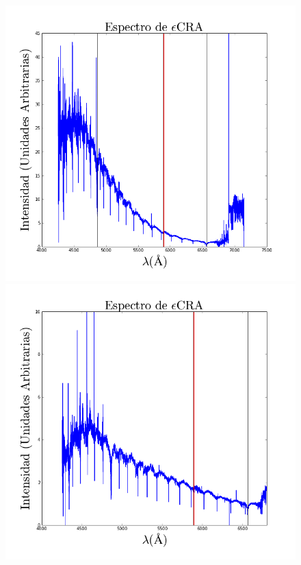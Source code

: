 \documentclass[Proceedings]{ascelike}
\begin{document}
\begin{figure}
\centering
\includegraphics[scale=0.33]{Espectro1.png}
\includegraphics[scale=0.33]{Espectro2.png}

\end{figure}
\end{document}
